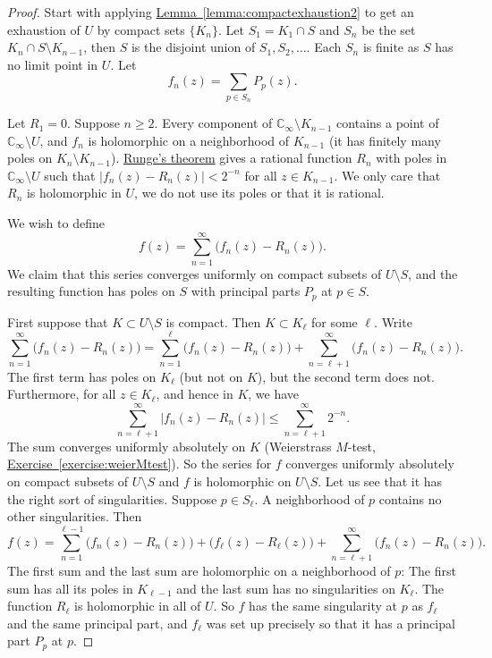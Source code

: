 \documentclass[12pt,openany]{book}
\newcommand{\sabs}[1]{\lvert {#1} \rvert}
\newcommand{\abs}[1]{\left\lvert {#1} \right\rvert}
\newcommand{\C}{{\mathbb{C}}}
\theoremstyle{plain}
\theoremstyle{remark}
\theoremstyle{definition}
\theoremstyle{exercise}
\theoremstyle{example}
\newcommand{\exerciseref}[1]{\hyperref[#1]{Exercise~\ref*{#1}}}
\newcommand{\lemmaref}[1]{\hyperref[#1]{Lemma~\ref*{#1}}}
\begin{document}
\begin{proof}
Start with applying \lemmaref{lemma:compactexhaustion2} to get an exhaustion
of $U$ by compact sets $\{ K_n \}$.  Let $S_1 = K_1 \cap S$ and
$S_n$ be the set $K_n \cap S \setminus K_{n-1}$, then $S$ is the disjoint
union of $S_1,S_2,\ldots$.  Each $S_n$ is finite as $S$ has no limit point
in $U$.
Let
\begin{equation*}
f_n(z) = \sum_{p \in S_n} P_p(z) .
\end{equation*}

Let $R_1=0$.  Suppose $n \geq 2$.
Every component of $\C_\infty \setminus K_{n-1}$ contains a point of
$\C_\infty \setminus U$, and $f_n$ is holomorphic on a neighborhood of
$K_{n-1}$ (it has finitely many poles on $K_n \setminus K_{n-1}$).
\hyperref[cor:rungeseq]{Runge's theorem}
gives a rational function $R_n$ with poles in 
$\C_\infty \setminus U$ such that $\sabs{f_n(z)-R_n(z)} < 2^{-n}$
for all $z \in K_{n-1}$.  We only care that $R_n$ is holomorphic in $U$, we
do not use its poles or that it is rational.

We wish to define
\begin{equation*}
f(z) = \sum_{n=1}^\infty \bigl( f_n(z) - R_n(z) \bigr) .
\end{equation*}
We claim that this series converges uniformly on compact subsets of $U \setminus S$,
and the resulting function has poles on $S$
with principal parts $P_p$ at $p \in S$.

First suppose that $K \subset U \setminus S$ is compact.  Then $K \subset
K_\ell$ for some $\ell$.  Write
\begin{equation*}
\sum_{n=1}^\infty \bigl( f_n(z) - R_n(z) \bigr)
=
\sum_{n=1}^{\ell} \bigl( f_n(z) - R_n(z) \bigr)
+
\sum_{n=\ell+1}^\infty \bigl( f_n(z) - R_n(z) \bigr) .
\end{equation*}
The first term has poles on $K_\ell$ (but not on $K$),
but the second term does not.  Furthermore, for all $z \in K_\ell$, and
hence in $K$, we have
\begin{equation*}
\sum_{n=\ell+1}^\infty \abs{ f_n(z) - R_n(z) }
\leq
\sum_{n=\ell+1}^\infty 2^{-n} .
\end{equation*}
The sum converges uniformly absolutely on $K$ (Weierstrass $M$-test,
\exerciseref{exercise:weierMtest}).
So the series for $f$ converges uniformly absolutely
on compact subsets of $U \setminus S$ and $f$ is holomorphic on $U
\setminus S$.  Let us see that it has the right sort of singularities.
Suppose $p \in S_\ell$.  A neighborhood of $p$ contains no other
singularities.  Then
\begin{equation*}
f(z) = 
\sum_{n=1}^{\ell-1} \bigl( f_n(z) - R_n(z) \bigr)
+
\bigl( f_\ell(z) - R_\ell(z) \bigr)
+
\sum_{n=\ell+1}^\infty \bigl( f_n(z) - R_n(z) \bigr) .
\end{equation*}
The first sum and the last sum are holomorphic on a neighborhood of $p$:
The first sum has all its poles in $K_{\ell-1}$ and
the last sum has no singularities on $K_\ell$.
The function $R_\ell$ is holomorphic in all of $U$.
So $f$ has the same singularity at $p$ as $f_\ell$ and the same principal
part, and $f_\ell$ was set up precisely so that it has a principal part
$P_p$ at $p$.
\end{proof}
\end{document}
